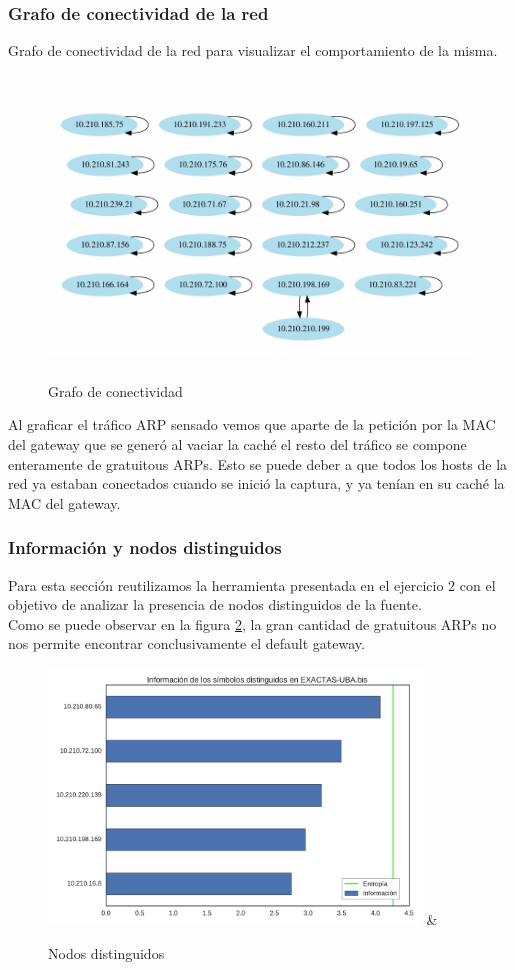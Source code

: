  \subsubsection{Grafo de conectividad de la red}
 Grafo de conectividad de la red para visualizar el comportamiento de la misma.


\begin{figure}[H]
   \centering
       \includegraphics[page=1,height=8cm ,width=1.08\textwidth]{../img/red-EXACTAS-UBA-bis}
 \caption{Grafo de conectividad}
 \label{fig:grafo-exactas}
\end{figure}

Al graficar el tráfico ARP sensado vemos que aparte de la petición por la MAC del gateway que se generó al vaciar la caché el resto del tráfico se compone enteramente de gratuitous ARPs.
Esto se puede deber a que todos los hosts de la red ya estaban conectados cuando se inició la captura, y ya tenían en su caché la MAC del gateway.


\subsubsection{Información y nodos distinguidos}

Para esta sección reutilizamos la herramienta presentada en el ejercicio 2 con el objetivo de analizar la presencia de nodos distinguidos de la fuente. \\

Como se puede observar en la figura \ref{fig:distinguidos-exactas}, la gran cantidad de gratuitous ARPs no nos permite encontrar conclusivamente el default gateway.

\begin{figure}[H]
   \centering
       \includegraphics[page=1, height=6.8cm ,width=\textwidth]{../img/distinguidos-EXACTAS-UBA-bis} &
 \caption{Nodos distinguidos}
 \label{fig:distinguidos-exactas}
\end{figure}


